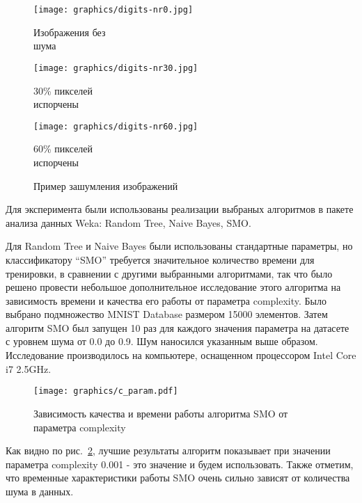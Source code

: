 \documentclass{article}
\begin{document}
\begin{figure}[ht!b]
\centering
\begin{minipage}{.3\textwidth}
	\texttt{[image: graphics/digits-nr0.jpg]}
	\captionsetup{justification=centering}
	\caption*{Изображения без\\ шума}
\end{minipage}
\begin{minipage}{.3\textwidth}
	\texttt{[image: graphics/digits-nr30.jpg]}
	\captionsetup{justification=centering}
	\caption*{ 30\% пикселей\\ испорчены}
\end{minipage}
\begin{minipage}{.3\textwidth}
	\texttt{[image: graphics/digits-nr60.jpg]}
	\captionsetup{justification=centering}
	\caption*{ 60\% пикселей\\ испорчены}
\end{minipage}
\caption{Пример зашумления изображений}
\label{fig:noise}
\end{figure}
Для эксперимента были использованы реализации выбраных алгоритмов в пакете анализа данных Weka: Random Tree, Naive Bayes, SMO.

Для Random Tree и Naive Bayes были использованы стандартные параметры, но классификатору ``SMO'' требуется значительное количество времени для тренировки, в сравнении с другими выбранными алгоритмами, так что было решено провести небольшое дополнительное исследование этого алгоритма на зависимость времени и качества его работы от параметра complexity. Было выбрано подмножество MNIST Database размером 15000 элементов. Затем алгоритм SMO был запущен 10 раз для каждого значения параметра на датасете с уровнем шума от 0.0 до 0.9. Шум наносился указанным выше образом. Исследование производилось на компьютере, оснащенном процессором Intel Core i7 2.5GHz.
\begin{figure}[ht!]
\texttt{[image: graphics/c\_param.pdf]}
\captionsetup{justification=centering}
\caption{Зависимость качества и времени работы алгоритма SMO от параметра complexity}
\label{fig:SMO_qual}
\end{figure}
Как видно по рис.~\ref{fig:SMO_qual}, лучшие результаты алгоритм показывает при значении параметра complexity 0.001 - это значение и будем использовать. Также отметим, что временные характеристики работы SMO очень сильно зависят от количества шума в данных.


\newpage
\end{document}

